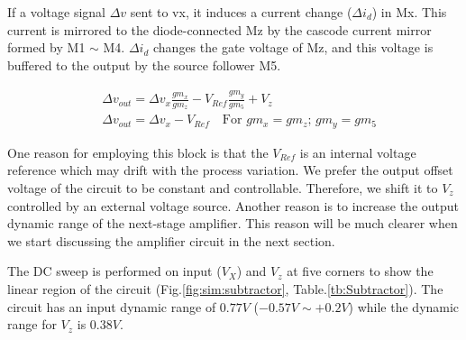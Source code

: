 {If a voltage signal $\Delta v$ sent to vx, it induces a current change ($\Delta i_d$) in Mx.
This current is mirrored to the diode-connected Mz by the cascode current mirror formed by M1 $\sim$ M4.
$\Delta i_d$ changes the gate voltage of Mz, and this voltage is buffered to the output by the source follower M5.

\begin{align}
    & \Delta v_{out} = \Delta v_{x}\frac{gm_x}{gm_z} - V_{Ref}\frac{gm_y}{gm_5} + V_z\\
    & \Delta v_{out} = \Delta v_{x} - V_{Ref} \quad \text{For $gm_x = gm_z$; $gm_y = gm_5$}
\end{align}

One reason for employing this block is that the $V_{Ref}$ is an internal voltage reference which may drift with the process variation.
We prefer the output offset voltage of the circuit to be constant and controllable.
Therefore, we shift it to $V_z$ controlled by an external voltage source.
Another reason is to increase the output dynamic range of the next-stage amplifier.
This reason will be much clearer when we start discussing the amplifier circuit in the next section.

The DC sweep is performed on input ($V_X$) and $V_z$ at five corners to show the linear region of the circuit (Fig.\ref{fig:sim:subtractor}, Table.\ref{tb:Subtractor}).
The circuit has an input dynamic range of $0.77V$ ($-0.57V \sim +0.2V$) while the dynamic range for $V_z$ is $0.38V$.

}
